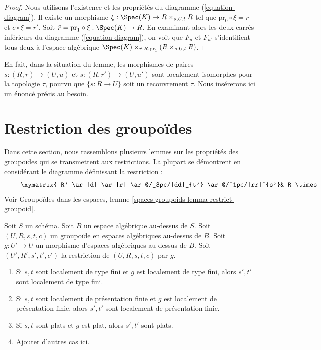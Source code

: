 \begin{proof}
Nous utilisons l'existence et les propriétés du
diagramme (\ref{equation-diagram}).
Il existe un morphisme $\xi : \Spec(K) \to R \times_{s, U, t} R$
tel que $\text{pr}_0 \circ \xi = r$ et $c \circ \xi = r'$.
Soit $\tilde r = \text{pr}_1 \circ \xi : \Spec(K) \to R$.
En examinant alors les deux carrés inférieurs du
diagramme (\ref{equation-diagram}),
on voit que $F_u$ et $F_{u'}$ s'identifient tous deux à l'espace algébrique
$\Spec(K) \times_{\tilde r, R, \text{pr}_1} (R \times_{s, U, t} R)$.
\end{proof}

\noindent
En fait, dans la situation du lemme, les morphismes de paires
$s : (R, r) \to (U, u)$ et $s : (R, r') \to (U, u')$ sont
localement isomorphes pour la topologie $\tau$, pourvu que $\{s: R \to U\}$
soit un recouvrement $\tau$. Nous insérerons ici un énoncé précis au besoin.








\section{Restriction des groupoïdes}
\label{section-restricting-groupoids}

\noindent
Dans cette section, nous rassemblons plusieurs lemmes sur les
propriétés des groupoïdes qui se transmettent aux restrictions.
La plupart se démontrent en considérant le diagramme
définissant la restriction :
\begin{equation}
\label{equation-restriction}
\vcenter{
\xymatrix{
R' \ar[d] \ar[r] \ar@/_3pc/[dd]_{t'} \ar@/^1pc/[rr]^{s'}&
R \times_{s, U} U' \ar[r] \ar[d] &
U' \ar[d]^g \\
U' \times_{U, t} R \ar[d] \ar[r] &
R \ar[r]^s \ar[d]_t &
U \\
U' \ar[r]^g &
U
}
}
\end{equation}
Voir
Groupoïdes dans les espaces, lemme \ref{spaces-groupoids-lemma-restrict-groupoid}.

\begin{lemma}
\label{lemma-restrict-preserves-type}
Soit $S$ un schéma. Soit $B$ un espace algébrique au-dessus de $S$.
Soit $(U, R, s, t, c)$ un groupoïde en espaces algébriques au-dessus de $B$.
Soit $g : U' \to U$ un morphisme d'espaces algébriques au-dessus de $B$.
Soit $(U', R', s', t', c')$ la restriction de
$(U, R, s, t, c)$ par $g$.
\begin{enumerate}
\item Si $s, t$ sont localement de type fini et $g$ est localement de type
fini, alors $s', t'$ sont localement de type fini.
\item Si $s, t$ sont localement de présentation finie et $g$ est localement de
présentation finie, alors $s', t'$ sont localement de présentation finie.
\item Si $s, t$ sont plats et $g$ est plat, alors $s', t'$ sont plats.
\item Ajouter d'autres cas ici.
\end{enumerate}
\end{lemma}

